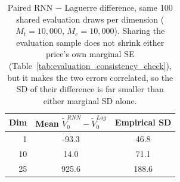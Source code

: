 \begin{table}

\caption{\label{tab:evaluation_consistency_check_paired}Paired RNN $-$ Laguerre difference, same 100 shared evaluation draws per dimension ($M_t=10{,}000$, $M_e=10{,}000$). Sharing the evaluation sample does not shrink either price's own marginal SE (Table~\ref{tab:evaluation_consistency_check}), but it makes the two errors correlated, so the SD of their difference is far smaller than either marginal SD alone.}
\footnotesize
\setlength{\tabcolsep}{4pt}
\centering
\begin{tabular}[t]{rcc}
\toprule
Dim & Mean $\tilde V_0^{RNN} - \tilde V_0^{Lag}$ & Empirical SD\\
\midrule
1 & -93.3 & 46.8\\
10 & 14.0 & 71.1\\
25 & 925.6 & 188.6\\
\bottomrule
\end{tabular}
\end{table}
